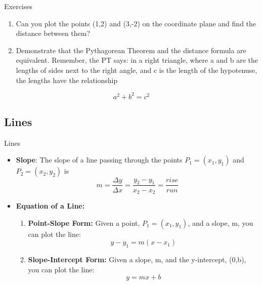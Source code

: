 \documentclass[]{beamer}
\begin{document}
    \begin{frame}{Exercises}
        \begin{enumerate}
            \item Can you plot the points (1,2) and (3,-2) on the coordinate plane and find the distance between them?
            \item Demonstrate that the Pythagorean Theorem and the distance formula are equivalent. Remember, the PT says:  in a right triangle, where a and b are the lengths of sides next to the right angle, and c is the length of the hypotenuse, the lengths have the relationship
        \end{enumerate}
        $$a^2 + b^2 = c^2$$
   \end{frame}
    \subsection{Lines}

    \begin{frame}{Lines}
       \begin{itemize}
            \item<2-> \textbf{Slope}: The slope of a line passing through the points $P_1 = (x_1, y_1)$ and $P_2 = (x_2, y_2) $ is 
                \begin{equation*}
                    m=\displaystyle \frac{\Delta y}{\Delta x}  = \displaystyle \frac{y_2 - y_1}{ x_2 - x_2} = \displaystyle \frac{rise}{run}
                \end{equation*}
            \item<3->\textbf{Equation of a Line:}
                \begin{enumerate}
                    \item<4-> \textbf{Point-Slope Form:} Given a point, $P_1 = (x_1, y_1)$, and a slope, m, you can plot the line:
                        \begin{equation*}
                            y-y_1 = m(x - x_1)
                        \end{equation*}
                    \item<5-> \textbf{Slope-Intercept Form:} Given a slope, m, and the y-intercept, (0,b), you can plot the line:
                        \begin{equation*}
                        y = mx + b
                        \end{equation*}

                \end{enumerate}
       \end{itemize}
    \end{frame}
\end{document}
